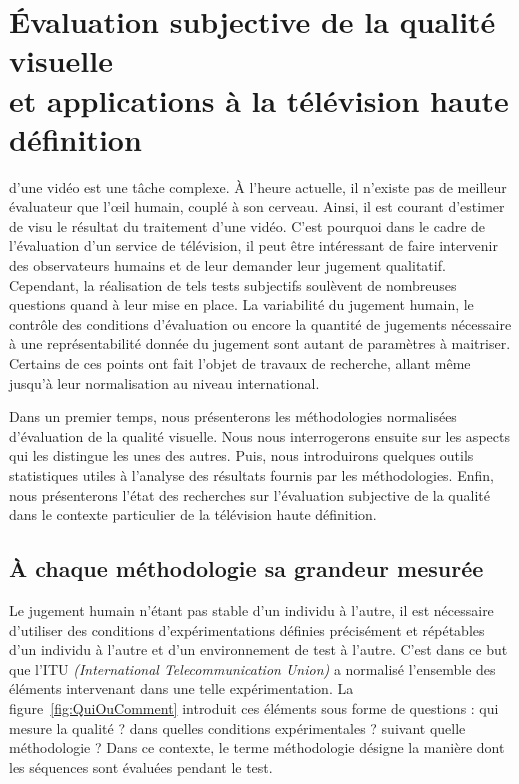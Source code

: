 \chapter[Évaluation subjective de la qualité visuelle et applications à la télévision haute définition]{Évaluation subjective de la qualité visuelle \\et applications à la télévision haute définition} \label{chap:evalSubj}
 d'une vidéo est une tâche complexe. À l'heure actuelle, il n'existe pas de meilleur évaluateur que l'\oe il humain, couplé à son cerveau. Ainsi, il est courant d'estimer de visu le résultat du traitement d'une vidéo. C'est pourquoi dans le cadre de l'évaluation d'un service de télévision, il peut être intéressant de faire intervenir des observateurs humains et de leur demander leur jugement qualitatif. Cependant, la réalisation de tels tests subjectifs soulèvent de nombreuses questions quand à leur mise en place. La variabilité du jugement humain, le contrôle des conditions d'évaluation ou encore la quantité de jugements nécessaire à une représentabilité donnée du jugement sont autant de paramètres à maitriser. Certains de ces points ont fait l'objet de travaux de recherche, allant même jusqu'à leur normalisation au niveau international.

Dans un premier temps, nous présenterons les méthodologies normalisées d'évaluation de la qualité visuelle. Nous nous interrogerons ensuite sur les aspects qui les distingue les unes des autres. Puis, nous introduirons quelques outils statistiques utiles à l'analyse des résultats fournis par les méthodologies. Enfin, nous présenterons l'état des recherches sur l'évaluation subjective de la qualité dans le contexte particulier de la télévision haute définition.


\section{À chaque méthodologie sa grandeur mesurée} \label{sec:A_chaque_methodologie_sa_grandeur_mesuree}
Le jugement humain n'étant pas stable d'un individu à l'autre, il est nécessaire d'utiliser des conditions d'expérimentations définies précisément et répétables d'un individu à l'autre et d'un environnement de test à l'autre. C'est dans ce but que l'ITU \emph{(International Telecommunication Union)} a normalisé l'ensemble des éléments intervenant dans une telle expérimentation. La figure~\ref{fig:QuiOuComment} introduit ces éléments sous forme de questions : qui mesure la qualité ? dans quelles conditions expérimentales ? suivant quelle méthodologie ? Dans ce contexte, le terme méthodologie désigne la manière dont les séquences sont évaluées pendant le test.

